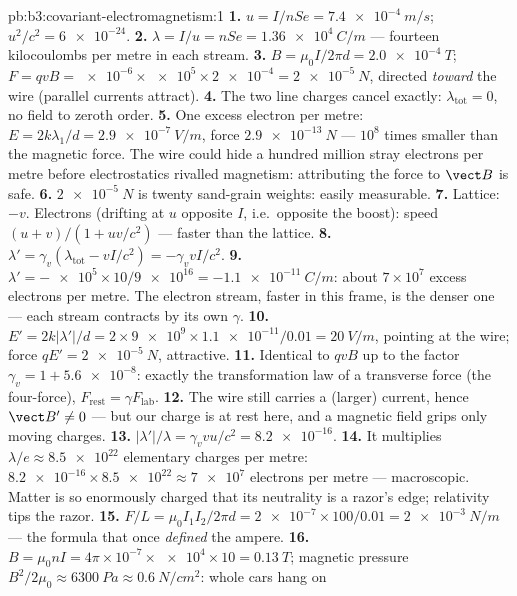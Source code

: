 \begin{solution}{pb:b3:covariant-electromagnetism:1}
\textbf{1.} $u = I/nSe = \qty{7.4e-4}{m/s}$; $u^2/c^2 =
\num{6e-24}$.
\textbf{2.} $\lambda = I/u = nSe = \qty{1.36e4}{C/m}$ --- fourteen
kilocoulombs per metre in each stream.
\textbf{3.} $B = \mu_0I/2\pi d = \qty{2.0e-4}{T}$; $F = qvB =
\num{e-6} \times \num{e5} \times \num{2e-4} = \qty{2e-5}{N}$,
directed \emph{toward} the wire (parallel currents attract).
\textbf{4.} The two line charges cancel exactly: $\lambda_{\text{tot}}
= 0$, no field to zeroth order.
\textbf{5.} One excess electron per metre: $E = 2k\lambda_1/d =
\qty{2.9e-7}{V/m}$, force $\qty{2.9e-13}{N}$ --- $10^8$ times smaller
than the magnetic force. The wire could hide a hundred million
stray electrons per metre before electrostatics rivalled magnetism:
attributing the force to $\vect B$ is safe.
\textbf{6.} $\qty{2e-5}{N}$ is twenty sand-grain weights: easily
measurable.
\textbf{7.} Lattice: $-v$. Electrons (drifting at $u$ opposite $I$,
i.e.\ opposite the boost): speed $(u + v)/(1 + uv/c^2)$ --- faster
than the lattice.
\textbf{8.} $\lambda' = \gamma_v(\lambda_{\text{tot}} - vI/c^2) =
-\gamma_v vI/c^2$.
\textbf{9.} $\lambda' = -\num{e5} \times 10/\num{9e16} =
\qty{-1.1e-11}{C/m}$: about $7 \times 10^7$ excess electrons per
metre. The electron stream, faster in this frame, is the denser one
--- each stream contracts by its own $\gamma$.
\textbf{10.} $E' = 2k|\lambda'|/d = 2 \times \num{9e9} \times
\num{1.1e-11}/0.01 = \qty{20}{V/m}$, pointing at the wire; force
$qE' = \qty{2e-5}{N}$, attractive.
\textbf{11.} Identical to $qvB$ up to the factor $\gamma_v = 1 +
\num{5.6e-8}$: exactly the transformation law of a transverse force
(the four-force), $F_{\text{rest}} = \gamma F_{\text{lab}}$.
\textbf{12.} The wire still carries a (larger) current, hence $\vect
B' \neq 0$ --- but our charge is at rest here, and a magnetic field
grips only moving charges.
\textbf{13.} $|\lambda'|/\lambda = \gamma_v vu/c^2 = \num{8.2e-16}$.
\textbf{14.} It multiplies $\lambda/e \approx \num{8.5e22}$
elementary charges per metre: $\num{8.2e-16} \times \num{8.5e22}
\approx \num{7e7}$ electrons per metre --- macroscopic. Matter is so
enormously charged that its neutrality is a razor's edge; relativity
tips the razor.
\textbf{15.} $F/L = \mu_0I_1I_2/2\pi d = \num{2e-7} \times 100/0.01 =
\qty{2e-3}{N/m}$ --- the formula that once \emph{defined} the ampere.
\textbf{16.} $B = \mu_0nI = 4\pi\times10^{-7} \times \num{e4} \times
10 = \qty{0.13}{T}$; magnetic pressure $B^2/2\mu_0 \approx
\qty{6300}{Pa} \approx \qty{0.6}{N/cm^2}$: whole cars hang on

\end{solution}
